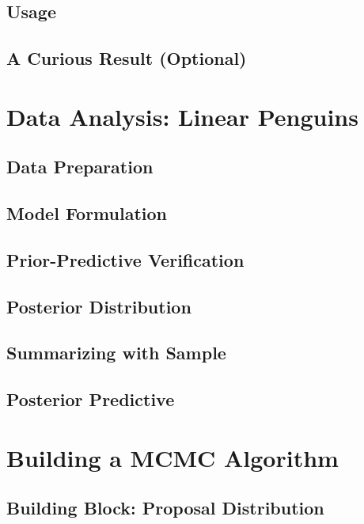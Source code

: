\documentclass[]{article}
\begin{document}
\subsection{Usage}


\subsection{A Curious Result (Optional)}

\section{Data Analysis: Linear Penguins}

\subsection{Data Preparation}

\subsection{Model Formulation}


\subsection{Prior-Predictive Verification}


\subsection{Posterior Distribution}

\subsection{Summarizing with Sample}

\subsection{Posterior Predictive}

\section{Building a MCMC Algorithm}

\subsection{Building Block: Proposal Distribution}

\end{document}
